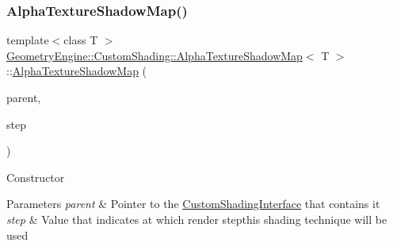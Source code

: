 \subsubsection{\texorpdfstring{AlphaTextureShadowMap()}{AlphaTextureShadowMap()}\hspace{0.1cm}{\footnotesize\ttfamily [1/2]}}
{\footnotesize\ttfamily template$<$class T $>$ \\
\mbox{\hyperlink{class_geometry_engine_1_1_custom_shading_1_1_alpha_texture_shadow_map}{Geometry\+Engine\+::\+Custom\+Shading\+::\+Alpha\+Texture\+Shadow\+Map}}$<$ T $>$\+::\mbox{\hyperlink{class_geometry_engine_1_1_custom_shading_1_1_alpha_texture_shadow_map}{Alpha\+Texture\+Shadow\+Map}} (\begin{DoxyParamCaption}\item[{\mbox{\hyperlink{class_geometry_engine_1_1_custom_shading_1_1_custom_shading_interface}{Custom\+Shading\+Interface}} $\ast$}]{parent,  }\item[{\mbox{\hyperlink{namespace_geometry_engine_1_1_custom_shading_a2dc236a5b567da5099069ce2b2be5609}{Custom\+Shading\+Steps}}}]{step }\end{DoxyParamCaption})\hspace{0.3cm}{\ttfamily [inline]}}

Constructor 
\begin{DoxyParams}{Parameters}
{\em parent} & Pointer to the \mbox{\hyperlink{class_geometry_engine_1_1_custom_shading_1_1_custom_shading_interface}{Custom\+Shading\+Interface}} that contains it \\
\hline
{\em step} & Value that indicates at which render stepthis shading technique will be used \\
\hline
\end{DoxyParams}
\mbox{\label{class_geometry_engine_1_1_custom_shading_1_1_alpha_texture_shadow_map_a48d3c0a306c157d9c56bfb68256a260c}} 
